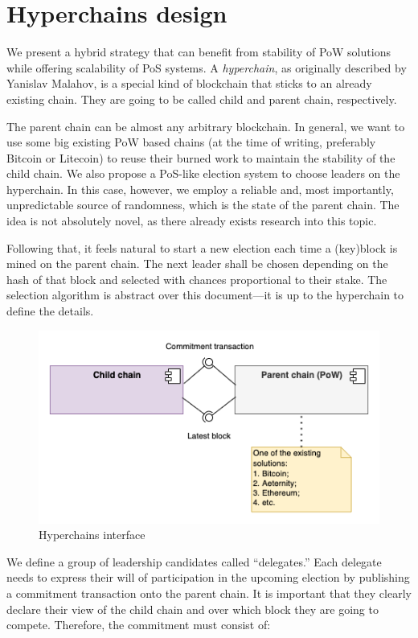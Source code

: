 \section{Hyperchains design}
\graphicspath{ {./images/} }

We present a hybrid strategy that can benefit from stability of PoW solutions
while offering scalability of PoS systems. A \emph{hyperchain}, as originally
described by Yanislav Malahov\cite{hyperchains}, is a special kind of blockchain
that sticks to an already existing chain. They are going to be called child and
parent chain, respectively.

The parent chain can be almost any arbitrary blockchain. In general, we want to
use some big existing PoW based chains (at the time of writing, preferably
Bitcoin or Litecoin) to reuse their burned work to maintain the stability of the
child chain. We also propose a PoS-like election system to choose leaders on the
hyperchain. In this case, however, we employ a reliable and, most importantly,
unpredictable source of randomness, which is the state of the parent chain. The
idea is not absolutely novel, as there already exists research into this
topic\cite{blockchain_random}.

Following that, it feels natural to start a new election each time a (key)block
is mined on the parent chain. The next leader shall be chosen depending on the
hash of that block and selected with chances proportional to their stake. The
selection algorithm is abstract over this document---it is up to the hyperchain
to define the details.

\begin{figure}[b]
     \caption{Hyperchains interface}
     \centering
     \includegraphics[scale=0.5]{hyperchains_interface}
\end{figure}

We define a group of leadership candidates called ``delegates.'' Each delegate
needs to express their will of participation in the upcoming election by
publishing a commitment transaction onto the parent chain. It is important that
they clearly declare their view of the child chain and over which block they are
going to compete. Therefore, the commitment must consist of:

